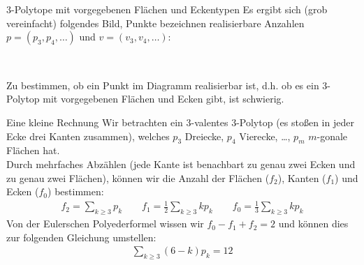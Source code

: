 \documentclass[10pt, notheorems]{beamer}
\begin{document}
\begin{frame}{$3$-Polytope mit vorgegebenen Flächen und Eckentypen}
  Es ergibt sich (grob vereinfacht) folgendes Bild, Punkte bezeichnen realisierbare Anzahlen $p = (p_3, p_4, \dots)$ und $v = (v_3, v_4, \dots)$:

  \vspace{0.5cm}
  { \centering
    \\
  }
  \vspace{0.5cm}
  \pause
  Zu bestimmen, ob ein Punkt im Diagramm realisierbar ist, d.h. ob es ein $3$-Polytop mit vorgegebenen Flächen und Ecken gibt, ist schwierig.
\end{frame}

\begin{frame}{Eine kleine Rechnung}
  Wir betrachten ein $3$-valentes $3$-Polytop (es stoßen in jeder Ecke drei Kanten zusammen), welches $p_3$ Dreiecke, $p_4$ Vierecke, \dots, $p_m$ $m$-gonale Flächen hat.\\
  \medskip
  \pause
  Durch  mehrfaches Abzählen (jede Kante ist benachbart zu genau zwei Ecken und zu genau zwei Flächen), können wir die Anzahl der Flächen ($f_2$), Kanten ($f_1$) und Ecken ($f_0$) bestimmen:
  \begin{align*}
    f_2 = \sum_{k \geq 3} p_k \qquad f_1 = \tfrac{1}{2}\sum_{k \geq 3} k p_k \qquad f_0 = \tfrac{1}{3}\sum_{k \geq 3} k p_k
  \end{align*}
  \pause
  Von der {\sc Euler}schen Polyederformel wissen wir $f_0 - f_1 + f_2 = 2$ und können dies zur folgenden Gleichung umstellen:
  \begin{align*}
    \sum_{k \geq 3} (6 - k) p_k = 12
  \end{align*}
\end{frame}
\end{document}
